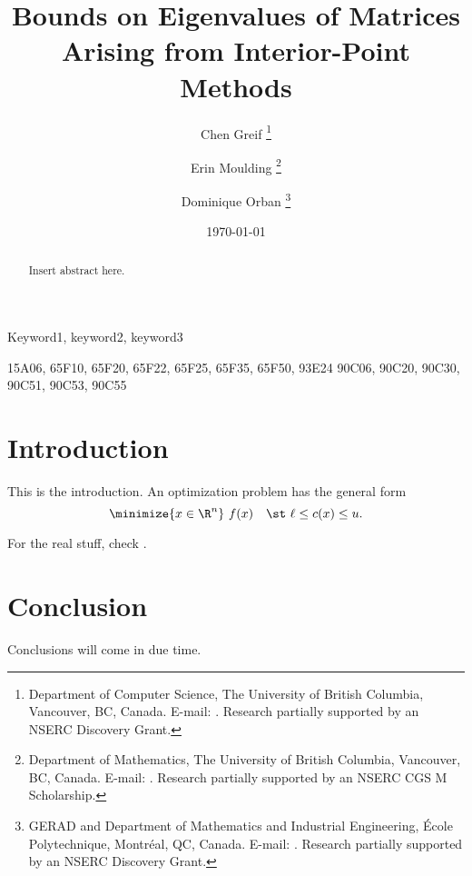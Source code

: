 \documentclass[review]{siamart0516}   %
\title{
  Bounds on Eigenvalues of Matrices Arising from Interior-Point Methods%
}
\author{
  Chen Greif%
  \thanks{%
    Department of Computer Science,
    The University of British Columbia,
    Vancouver, BC, Canada.
    E-mail: \mailto{greif@cs.ubc.ca}.
    Research partially supported by an NSERC Discovery Grant.
  }
  \and
  Erin Moulding%
  \thanks{%
    Department of Mathematics,
    The University of British Columbia,
    Vancouver, BC, Canada.
    E-mail: \mailto{moulding@math.ubc.ca}.
    Research partially supported by an NSERC CGS M Scholarship.
  }
  \and
  Dominique Orban%
  \thanks{%
    GERAD and Department of Mathematics and Industrial Engineering,
    \'Ecole Polytechnique, Montr\'eal, QC, Canada.
    E-mail: \mailto{dominique.orban@gerad.ca}.
    Research partially supported by an NSERC Discovery Grant.
  }
}
\date{\today}
\begin{document}
  \linenumbers
  \maketitle

  \thispagestyle{firstpage}
  \pagestyle{myheadings}

  \begin{abstract}
    Insert abstract here. 
  \end{abstract}

  \begin{keywords}
    Keyword1, keyword2, keyword3
  \end{keywords}

  \begin{AMS}
    15A06,  %
    65F10,  %
    65F20,  %
    65F22,  %
    65F25,  %
    65F35,  %
    65F50,  %
    93E24   %
    90C06,  %
    90C20,  %
    90C30,  %
    90C51,  %
    90C53,  %
    90C55   %
  \end{AMS}

  \tableofcontents
  \listoftodos\relax

  \section{Introduction}

  This is the introduction. An optimization problem has the general form
  \begin{equation}
    \label{eq:opt-problem}
    \minimize{x \in \R^n} \ f(x) \quad \st \ \ell \leq c(x) \leq u.
  \end{equation}

  For the real stuff, check \cite{wright-orban-2002}.

  \section{Conclusion}

  Conclusions will come in due time. 

  
  
\end{document}
